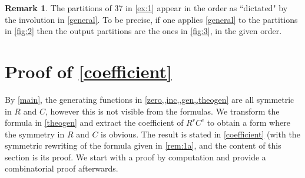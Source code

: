 \documentclass[12pt,reqno]{amsart}
\numberwithin{equation}{section}
\theoremstyle{definition}
\newtheorem{remark}[theorem]{Remark}
\begin{document}
\begin{remark}
The partitions of 37 in \cref{ex:1} appear in the order as ``dictated"
by the involution in \cref{general}. 
To be precise, if one applies \cref{general} to 
the partitions in \cref{fig:2} then the output partitions are the
ones in \cref{fig:3}, in the given order.
\end{remark}

\section{Proof of \cref{coefficient}}
\label{sec:5}
By \cref{main}, the generating functions in 
\cref{zero,,inc,,gen,,theogen} are all symmetric in
$R$ and $C$, however this is not visible from the formulas. We transform the formula in \cref{theogen} and extract the coefficient
of $R^r C^c$ to obtain a form where the symmetry in $R$ and $C$ is
obvious. The result is stated in \cref{coefficient} (with the
symmetric rewriting of the formula given in
\cref{rem:1a},
and the
content of this 
section is its proof. We start with a proof by computation and provide a combinatorial proof afterwards.
\end{document}
